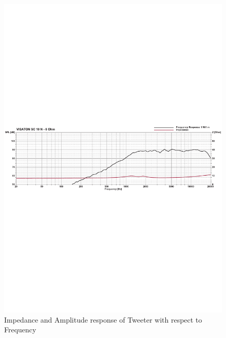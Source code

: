 \documentclass[main.tex]{subfiles}
\begin{document}
\begin{figure}[H]
    \centering
    \includegraphics[scale=0.6]{./figs/tweeter-response.pdf}        
    \caption{Impedance and Amplitude response of Tweeter with respect to Frequency\cite{tweeter}}
    \label{fig:tweeter-response}
\end{figure}
\end{document}
